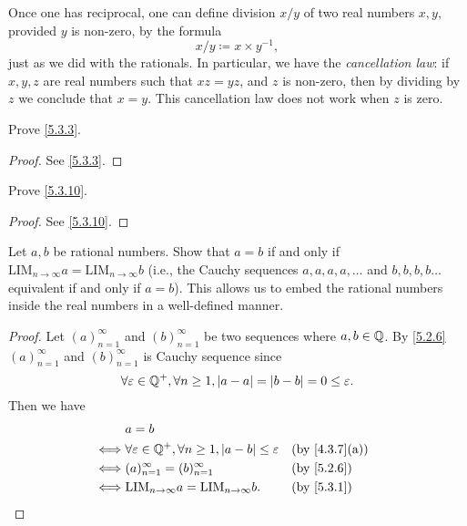 \begin{note}
  Once one has reciprocal, one can define division \(x / y\) of two real numbers \(x, y\), provided \(y\) is non-zero, by the formula
  \[
    x / y \coloneqq x \times y^{-1},
  \]
  just as we did with the rationals.
  In particular, we have the \emph{cancellation law}:
  if \(x, y, z\) are real numbers such that \(xz = yz\), and \(z\) is non-zero, then by dividing by \(z\) we conclude that \(x = y\).
  This cancellation law does not work when \(z\) is zero.
\end{note}

\exercisesection

\begin{ex}\label{ex:5.3.1}
  Prove \cref{5.3.3}.
\end{ex}

\begin{proof}
  See \cref{5.3.3}.
\end{proof}

\begin{ex}\label{ex:5.3.2}
  Prove \cref{5.3.10}.
\end{ex}

\begin{proof}
  See \cref{5.3.10}.
\end{proof}

\begin{ex}\label{ex:5.3.3}
  Let \(a, b\) be rational numbers.
  Show that \(a = b\) if and only if \(\text{LIM}_{n \to \infty} a = \text{LIM}_{n \to \infty} b\) (i.e., the Cauchy sequences \(a, a, a, a, \dots\) and \(b, b, b, b \dots\) equivalent if and only if \(a = b\)).
  This allows us to embed the rational numbers inside the real numbers in a well-defined manner.
\end{ex}

\begin{proof}
  Let \((a)_{n = 1}^{\infty}\) and \((b)_{n = 1}^{\infty}\) be two sequences where \(a, b \in \mathbb{Q}\).
  By \cref{5.2.6} \((a)_{n = 1}^\infty\) and \((b)_{n = 1}^\infty\) is Cauchy sequence since
  \[
    \forall \varepsilon \in \mathbb{Q}^+, \forall n \geq 1, \left\lvert a - a\right\rvert = \left\lvert b - b\right\rvert = 0 \leq \varepsilon.
  \]
  Then we have
  \begin{align*}
         & a = b                                                                                                         \\
    \iff & \forall \varepsilon \in \Q^+, \forall n \geq 1, \abs{a - b} \leq \varepsilon &  & \text{(by \cref{4.3.7}(a))} \\
    \iff & (a)_{n = 1}^\infty = (b)_{n = 1}^\infty                                      &  & \text{(by \cref{5.2.6})}    \\
    \iff & \text{LIM}_{n \to \infty} a = \text{LIM}_{n \to \infty} b.                   &  & \text{(by \cref{5.3.1})}
  \end{align*}
\end{proof}

